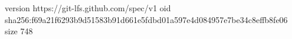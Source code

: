 version https://git-lfs.github.com/spec/v1
oid sha256:f69a21f6293b9d51583b91d661e5fdbd01a597e4d084957e7be34c8effb8fe06
size 748
